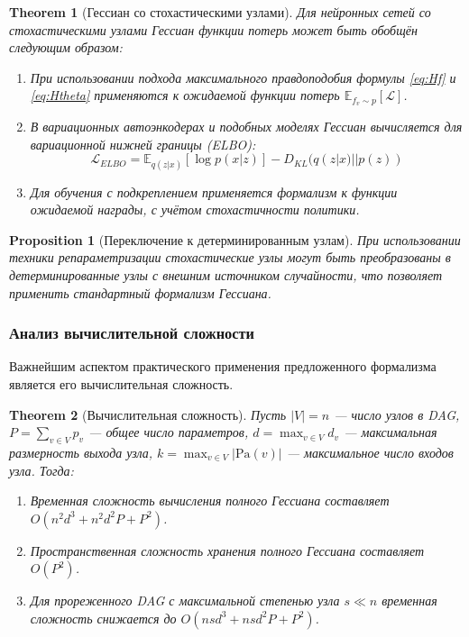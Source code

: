 \documentclass[11pt]{article}
\newtheorem{theorem}{Theorem}
\newtheorem{proposition}{Proposition}
\newcommand{\Pa}{\mathrm{Pa}} %
\begin{document}
\begin{theorem}[Гессиан со стохастическими узлами]
  Для нейронных сетей со стохастическими узлами Гессиан функции потерь может быть обобщён следующим образом:
  \begin{enumerate}
    \item При использовании подхода максимального правдоподобия формулы \eqref{eq:Hf} и \eqref{eq:Htheta}
      применяются к ожидаемой функции потерь $\mathbb{E}_{f_v \sim p}[\mathcal{L}]$.
    \item В вариационных автоэнкодерах и подобных моделях Гессиан вычисляется для вариационной нижней границы (ELBO):
      \[
        \mathcal{L}_{ELBO} = \mathbb{E}_{q(z|x)}[\log p(x|z)] - D_{KL}(q(z|x) || p(z))
      \]
    \item Для обучения с подкреплением применяется формализм к функции ожидаемой награды, с учётом
      стохастичности политики.
  \end{enumerate}
\end{theorem}

\begin{proposition}[Переключение к детерминированным узлам]
  При использовании техники репараметризации стохастические узлы могут быть преобразованы в детерминированные
  узлы с внешним источником случайности, что позволяет применить стандартный формализм Гессиана.
\end{proposition}

\subsubsection{Анализ вычислительной сложности}

Важнейшим аспектом практического применения предложенного формализма является его вычислительная сложность.

\begin{theorem}[Вычислительная сложность]
  Пусть $|V|=n$ — число узлов в DAG, $P = \sum_{v \in V} p_v$ — общее число параметров, $d = \max_{v \in V}
  d_v$ — максимальная размерность выхода узла, $k = \max_{v \in V} |\Pa(v)|$ — максимальное число входов узла. Тогда:

  \begin{enumerate}
    \item Временная сложность вычисления полного Гессиана составляет $O(n^2 d^3 + n^2 d^2 P + P^2)$.
    \item Пространственная сложность хранения полного Гессиана составляет $O(P^2)$.
    \item Для прореженного DAG с максимальной степенью узла $s \ll n$ временная сложность снижается до $O(n s
      d^3 + n s d^2 P + P^2)$.
  \end{enumerate}
\end{theorem}
\end{document}
